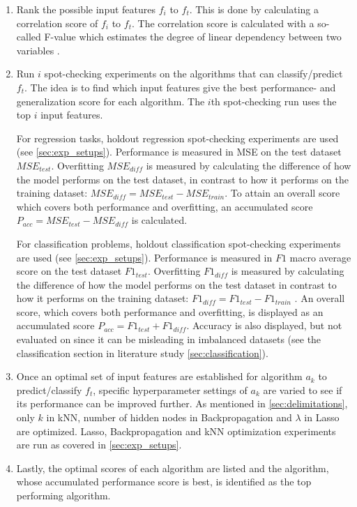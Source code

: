 		\begin{enumerate}
			\item Rank the possible input features $f_i$ to $f_t$. This is done by calculating a correlation score of $f_i$ to $f_t$. The correlation score is calculated with a so-called F-value which estimates the degree of linear dependency between two variables \cite{WEBSITE:28, WEBSITE:29}. 
			\item Run $i$ spot-checking experiments on the algorithms that can classify/predict $f_t$. The idea is to find which input features give the best performance- and generalization score for each algorithm. The $i$th spot-checking run uses the top $i$ input features.

				For regression tasks, holdout regression spot-checking experiments are used (see \ref{sec:exp_setups}). Performance is measured in MSE on the test dataset $MSE_{test}$. Overfitting $MSE_{diff}$ is measured by calculating the difference of how the model performs on the test dataset, in contrast to how it performs on the training dataset: $MSE_{diff} = MSE_{test} - MSE_{train}$. To attain an overall score which covers both performance and overfitting, an accumulated score $P_{acc} = MSE_{test} - MSE_{diff}$ is calculated.

				For classification problems, holdout classification spot-checking experiments are used (see \ref{sec:exp_setups}). Performance is measured in $F1$ macro average score on the test dataset $F1_{test}$. Overfitting $F1_{diff}$ is measured by calculating the difference of how the model performs on the test dataset in contrast to how it performs on the training dataset: $F1_{diff} = F1_{test} - F1_{train}$ . An overall score, which covers both performance and overfitting, is displayed as an accumulated score $P_{acc} = F1_{test} + F1_{diff}$. Accuracy is also displayed, but not evaluated on since it can be misleading in imbalanced datasets (see the classification section in literature study \ref{sec:classification}).

			\item Once an optimal set of input features are established for algorithm $a_k$ to predict/classify $f_t$, specific hyperparameter settings of $a_k$ are varied to see if its performance can be improved further. As mentioned in \ref{sec:delimitations}, only $k$ in kNN, number of hidden nodes in Backpropagation and $\lambda$ in Lasso are optimized. Lasso, Backpropagation and kNN optimization experiments are run as covered in \ref{sec:exp_setups}.
			\item Lastly, the optimal scores of each algorithm are listed and the algorithm, whose accumulated performance score is best, is identified as the top performing algorithm.
		\end{enumerate}
		

